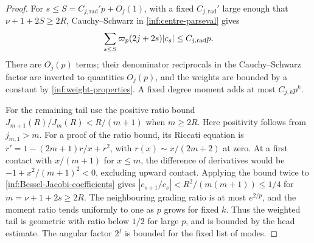 \begin{proof}
For $s\le S=C_{j,\mathrm{rad}}'p+O_j(1)$, with a fixed $C_{j,\mathrm{rad}}'$ large enough that
$\nu+1+2S\ge2R$, Cauchy--Schwarz in
\eqref{inf:centre-parseval} gives
\[
 \sum_{s\le S}\varpi_p(2j+2s)|c_s|\le C_{j,\mathrm{rad}}p.
\]
There are $O_j(p)$ terms; their denominator reciprocals in the
Cauchy--Schwarz factor are inverted to quantities $O_j(p)$, and
the weights are bounded by a constant by \eqref{inf:weight-properties}.
A fixed degree moment adds at most $C_{j,k}p^k$.

For the remaining tail use the positive ratio bound
$J_{m+1}(R)/J_m(R)<R/(m+1)$ when $m\ge2R$.
Here positivity follows from $j_{m,1}>m$.
For a proof of the ratio bound, its Riccati equation is
$r'=1-(2m+1)r/x+r^2$, with
$r(x)\sim x/(2m+2)$ at zero. At a first contact with
$x/(m+1)$ for $x\le m$, the difference of derivatives would be
$-1+x^2/(m+1)^2<0$, excluding upward contact.
Applying the bound twice to \eqref{inf:Bessel-Jacobi-coefficients}
gives $|c_{s+1}/c_s|<R^2/(m(m+1))\le1/4$ for
$m=\nu+1+2s\ge2R$.
The neighbouring grading ratio is at most $e^{2/p}$, and the
moment ratio tends uniformly to one as $p$ grows for fixed $k$.
Thus the weighted tail is geometric with ratio below $1/2$ for
large $p$, and is bounded by the head estimate. The angular factor
$2^j$ is bounded for the fixed list of modes.
\end{proof}

